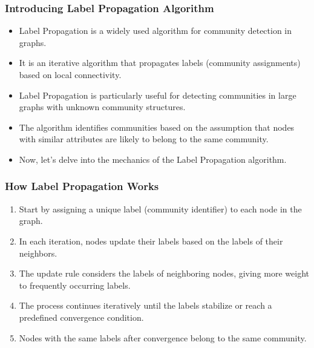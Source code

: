 \begin{frame}[fragile]\frametitle{Introducing Label Propagation Algorithm}
\begin{itemize}
\item Label Propagation is a widely used algorithm for community detection in graphs.
\item It is an iterative algorithm that propagates labels (community assignments) based on local connectivity.
\item Label Propagation is particularly useful for detecting communities in large graphs with unknown community structures.
\item The algorithm identifies communities based on the assumption that nodes with similar attributes are likely to belong to the same community.
\item Now, let's delve into the mechanics of the Label Propagation algorithm.
\end{itemize}
\end{frame}

\begin{frame}[fragile]\frametitle{How Label Propagation Works}
\begin{enumerate}
\item Start by assigning a unique label (community identifier) to each node in the graph.
\item In each iteration, nodes update their labels based on the labels of their neighbors.
\item The update rule considers the labels of neighboring nodes, giving more weight to frequently occurring labels.
\item The process continues iteratively until the labels stabilize or reach a predefined convergence condition.
\item Nodes with the same labels after convergence belong to the same community.
\end{enumerate}
\end{frame}

